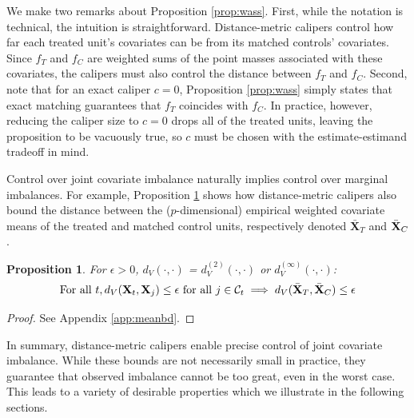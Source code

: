 \documentclass{article}
\newtheorem{proposition}[theorem]{Proposition}
\newcommand{\bX}{\mathbf{X}}
\newcommand{\Xt}{\mathbf{X}_t}
\newcommand{\Xj}{\mathbf{X}_j}
\newcommand{\Ct}{\mathcal{C}_{t}}
\begin{document}
We make two remarks about Proposition \ref{prop:wass}.
First, while the notation is technical, the intuition is straightforward.
Distance-metric calipers control how far each treated unit's covariates can be from its matched controls' covariates.
Since $f_T$ and $f_C$ are weighted sums of the point masses associated with these covariates, the calipers must also control the distance between $f_T$ and $f_C$.
Second, note that for an exact caliper $c=0$, Proposition \ref{prop:wass} simply states that exact matching guarantees that $f_T$ coincides with $f_C$.
In practice, however, reducing the caliper size to $c=0$ drops all of the treated units, leaving the proposition to be vacuously true, so $c$ must be chosen with the estimate-estimand tradeoff in mind.

Control over joint covariate imbalance naturally implies control over marginal imbalances.
For example, Proposition \ref{prop:meanbd} shows how distance-metric calipers also bound the distance between the ($p$-dimensional) empirical weighted covariate means of the treated and matched control units, respectively denoted $\bar{\bX}_T$ and $\Bar{\bX}_C$.
\begin{proposition}
\label{prop:meanbd}
    For $\epsilon > 0$, $d_V(\cdot, \cdot)$ = $d^{(2)}_V(\cdot, \cdot)$ or $d^{(\infty)}_V(\cdot, \cdot)$:
    \begin{align*}
        \text{For all } t, d_V(\Xt, \Xj) \leq \epsilon \text{ for all } j \in \Ct
        \implies d_V(\bar{\bX}_T, \Bar{\bX}_C) \leq \epsilon
    \end{align*}
\end{proposition}
\begin{proof}
    See Appendix \ref{app:meanbd}.
\end{proof}

In summary, distance-metric calipers enable precise control of joint covariate imbalance.
While these bounds are not necessarily small in practice, they guarantee that observed imbalance cannot be too great, even in the worst case.
This leads to a variety of desirable properties which we illustrate in the following sections.
\end{document}
